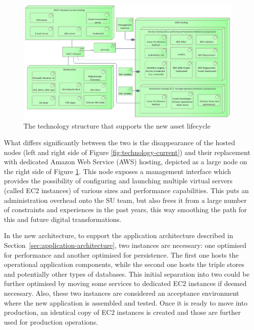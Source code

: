 	\begin{figure}[!h]
		\centering
		\includegraphics[width=1.01\textwidth]{images/technology/New Platform.png}
		\caption{The technology structure that supports the new asset lifecycle}
		\label{fig:technology-new}
	\end{figure}

	What differs significantly between the two is the disappearance of the hosted nodes (left and right side of Figure \ref{fig:technology-current}) and their replacement with dedicated Amazon Web Service (AWS) hosting, depicted as a large node on the right side of Figure \ref{fig:technology-new}. This node exposes a management interface which provides the possibility of configuring and launching multiple virtual servers (called EC2 instances) of various sizes and performance capabilities. This puts an administration overhead onto the SU team, but also frees it from a large number of constraints and experiences in the past years, this way smoothing the path for this and future digital transformations.
	
	In the new architecture, to support the application architecture described in \mbox{Section \ref{sec:application-architecture}}, two instances are necessary: one optimised for performance and another optimised for persistence. The first one hosts the operational application components, while the second one hosts the triple stores and potentially other types of databases. This initial separation into two could be further optimised by moving some services to dedicated EC2 instances if deemed necessary. Also, these two instances are considered an acceptance environment where the new application is assembled and tested. Once it is ready to move into production, an identical copy of EC2 instances is created and those are further used for production operations. 
	
